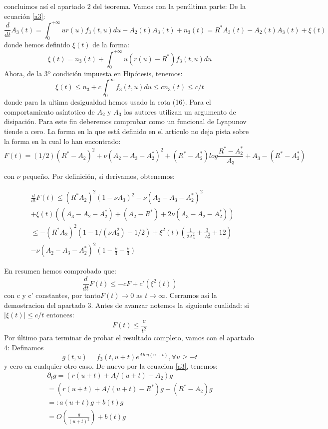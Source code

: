 \documentclass[1p]{elsarticle}
\begin{document}
concluimos así el apartado 2 del teorema. Vamos con la penúltima parte:
De la ecuación \ref{a3}:
$$\frac{d}{dt}A_3 (t) =\int_{0}^{+\infty}
ur(u)f_3 (t, u) du-A_2 (t)A_3 (t)+n_3 (t) = R^* A_3 (t)-A_2 (t)A_3 (t)+\xi(t)$$
donde hemos definido $\xi(t)$ de la forma:
$$\xi(t) = n_3 (t)+\int_{0}^{+\infty}u(r(u)-R^* )f_3 (t, u) du$$
Ahora, de la 3º condición impuesta en Hipótesis, tenemos:
$$\xi(t)\leq n_3 +c\int_{0}^{\infty}f_3 (t, u) du\leq cn_3 (t)\leq c/t$$
donde para la ultima desigualdad hemos usado la cota (16).
Para el comportamiento asíntotico de $A_2$ y $A_3$ los autores utilizan un argumento de disipación. Para este fin deberemos comprobar como un funcional de Lyapunov tiende a cero. La forma en la que está definido en el artículo no deja pista sobre la forma en la cual lo han encontrado:
$$F(t) =(1/2)(R^* -A_ 2)^2 +\nu(A_2 -A_3 -A^*_2 )^2 +(R^* -A^*_ 2 ) log\frac{R^*-A^*_2}{A_3}+A_3-(R^*-A^*_2)$$

con $\nu$ pequeño. Por definición, si derivamos, obtenemos:

\begin{equation}
\begin{split}
&\frac{d}{dt}F(t)\leq  (R^*A_2 )^2 (1-\nu A_3 )^2 -\nu(A_2 -A_3 -A^*_ 2 )^2\\
&+\xi(t)((A_3 -A_2 -A^*_2 )+ (A_2 -R^* )+2\nu(A_3 -A_2 -A^*_2 ))\\
&\leq -(R^*A_2 )^2(1-1/(\nu A_3^2)-1/2)+\xi^2(t)(\frac{1}{2A_3^2}+\frac{3}{A_2^2}+12)\\
&-\nu(A_2-A_3-A_2^*)^2(1-\frac{\nu}{3}-\frac{\nu}{3})
\end{split} 
\end{equation}

En resumen hemos comprobado que:
$$\frac{d}{dt}F(t)\leq -cF+c'(\xi^2(t))$$
con c y c' constantes, por tanto$ F(t) \rightarrow 0$ as $t \rightarrow \infty$. Cerramos así la demostracion del apartado 3.
Antes de avanzar notemos la siguiente cualidad: si $|\xi(t)|\leq c/t$
entonces:
$$F(t)\leq\frac{c}{t^2}$$
Por último para terminar de probar el resultado completo, vamos con el apartado 4:
Definamos
$$
g(t, u) =f_3 (t, u+t)e^{A log(u+t)}, \forall u\geq-t$$
y cero en cualquier otro caso. De nuevo por la ecuacion \ref{a3}, tenemos:
\begin{equation}
\begin{split}
\partial_t g=(r(u+t)+A/(u+t)-A_2)g\\
=(r(u+t)+A/(u+t)-R^*)g+(R^*-A_2)g\\
=:a(u+t)g+b(t)g\\
=O(\frac{g}{(u+t)^2})+b(t)g
\end{split} 
\end{equation}
\end{document}

